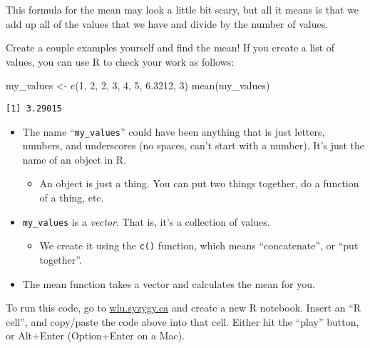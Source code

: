 \documentclass[
  letterpaper,
  DIV=11,
  numbers=noendperiod]{scrreprt}
\newenvironment{Shaded}{\begin{snugshade}}{\end{snugshade}}
\newcommand{\DecValTok}[1]{\textcolor[rgb]{0.68,0.00,0.00}{#1}}
\newcommand{\FloatTok}[1]{\textcolor[rgb]{0.68,0.00,0.00}{#1}}
\newcommand{\FunctionTok}[1]{\textcolor[rgb]{0.28,0.35,0.67}{#1}}
\newcommand{\NormalTok}[1]{\textcolor[rgb]{0.00,0.23,0.31}{#1}}
\newcommand{\OtherTok}[1]{\textcolor[rgb]{0.00,0.23,0.31}{#1}}
\providecommand{\tightlist}{%
  \setlength{\itemsep}{0pt}\setlength{\parskip}{0pt}}\usepackage{longtable,booktabs,array}
\begin{document}
This formula for the mean may look a little bit scary, but all it means
is that we add up all of the values that we have and divide by the
number of values.

Create a couple examples yourself and find the mean! If you create a
list of values, you can use R to check your work as follows:

\begin{Shaded}
\begin{Highlighting}[]
\NormalTok{my\_values }\OtherTok{\textless{}{-}} \FunctionTok{c}\NormalTok{(}\DecValTok{1}\NormalTok{, }\DecValTok{2}\NormalTok{, }\DecValTok{2}\NormalTok{, }\DecValTok{3}\NormalTok{, }\DecValTok{4}\NormalTok{, }\DecValTok{5}\NormalTok{, }\FloatTok{6.3212}\NormalTok{, }\DecValTok{3}\NormalTok{)}
\FunctionTok{mean}\NormalTok{(my\_values)}
\end{Highlighting}
\end{Shaded}

\begin{verbatim}
[1] 3.29015
\end{verbatim}

\begin{itemize}
\tightlist
\item
  The name ``\texttt{my\_values}'' could have been anything that is just
  letters, numbers, and underscores (no spaces, can't start with a
  number). It's just the name of an object in R.

  \begin{itemize}
  \tightlist
  \item
    An object is just a thing. You can put two things together, do a
    function of a thing, etc.
  \end{itemize}
\item
  \texttt{my\_values} is a \emph{vector}. That is, it's a collection of
  values.

  \begin{itemize}
  \tightlist
  \item
    We create it using the \texttt{c()} function, which means
    ``concatenate'', or ``put together''.
  \end{itemize}
\item
  The mean function takes a vector and calculates the mean for you.
\end{itemize}

To run this code, go to \url{wlu.syzygy.ca} and create a new R notebook.
Insert an ``R cell'', and copy/paste the code above into that cell.
Either hit the ``play'' button, or Alt+Enter (Option+Enter on a Mac).
\end{document}

